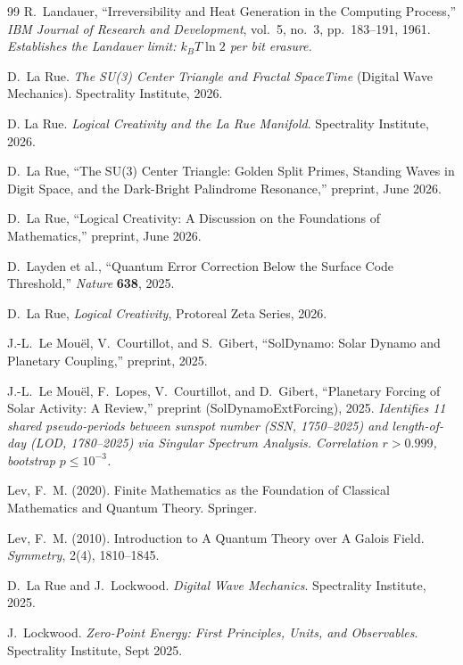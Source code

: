 \documentclass[12pt,oneside]{book}
\theoremstyle{principia}
\theoremstyle{definition}
\theoremstyle{remark}
\begin{document}
\begin{thebibliography}{99}
R.~Landauer,
``Irreversibility and Heat Generation in the Computing Process,''
\emph{IBM Journal of Research and Development}, vol.~5, no.~3, pp.~183--191, 1961.
\textit{Establishes the Landauer limit: $k_B T \ln 2$ per bit erasure.}

D.~La Rue.
\textit{The SU(3) Center Triangle and Fractal SpaceTime} (Digital Wave Mechanics).
Spectrality Institute, 2026.

D. La Rue.
\textit{Logical Creativity and the La Rue Manifold}.
Spectrality Institute, 2026.

D.~La Rue, ``The SU(3) Center Triangle: Golden Split Primes, Standing Waves in Digit Space, and the Dark-Bright Palindrome Resonance,'' preprint, June 2026.

D.~La Rue, ``Logical Creativity: A Discussion on the Foundations of Mathematics,'' preprint, June 2026.

D.~Layden et al., ``Quantum Error Correction Below the Surface Code Threshold,'' \emph{Nature} \textbf{638}, 2025.

D.~La Rue, \emph{Logical Creativity}, Protoreal Zeta Series, 2026.

J.-L.~Le Mou\"{e}l, V.~Courtillot, and S.~Gibert, ``SolDynamo: Solar Dynamo and Planetary Coupling,'' preprint, 2025.

J.-L.~Le Mou\"{e}l, F.~Lopes, V.~Courtillot, and D.~Gibert,
``Planetary Forcing of Solar Activity: A Review,''
preprint (SolDynamoExtForcing), 2025.
\textit{Identifies 11 shared pseudo-periods between sunspot number (SSN, 1750--2025)
and length-of-day (LOD, 1780--2025) via Singular Spectrum Analysis.
Correlation $r > 0.999$, bootstrap $p \leq 10^{-3}$.}

Lev, F.~M. (2020).
Finite Mathematics as the Foundation of Classical Mathematics and Quantum Theory.
Springer.

Lev, F.~M. (2010).
Introduction to A Quantum Theory over A Galois Field.
\emph{Symmetry}, 2(4), 1810--1845.

D.~La Rue and J.~Lockwood.
\textit{Digital Wave Mechanics}.
Spectrality Institute, 2025.

J.~Lockwood.
\textit{Zero-Point Energy: First Principles, Units, and Observables}.
Spectrality Institute, Sept 2025.


\end{thebibliography}
\end{document}
